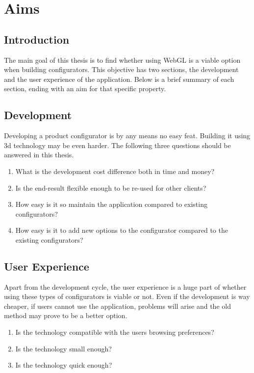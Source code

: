 \chapter{Aims}
\section{Introduction}
The main goal of this thesis is to find whether using WebGL is a viable option when building configurators. This objective has two sections, the development and the user experience of the application. Below is a brief summary of each section, ending with an aim for that specific property.
\section{Development}
Developing a product configurator is by any means no easy feat. Building it using 3d technology may be even harder. The following three questions should be answered in this thesis.
​\begin{enumerate}
\item What is the development cost difference both in time and money?
\item Is the end-result flexible enough to be re-used for other clients?
\item How easy is it so maintain the application compared to existing configurators?
\item How easy is it to add new options to the configurator compared to the existing configurators?
\end{enumerate}

\section{User Experience}
Apart from the development cycle, the user experience is a huge part of whether using these types of configurators is viable or not. Even if the development is way cheaper, if users cannot use the application, problems will arise and the old method may prove to be a better option.\begin{enumerate}
\item Is the technology compatible with the users browsing preferences?
\item Is the technology small enough?
\item Is the technology quick enough?
\end{enumerate}